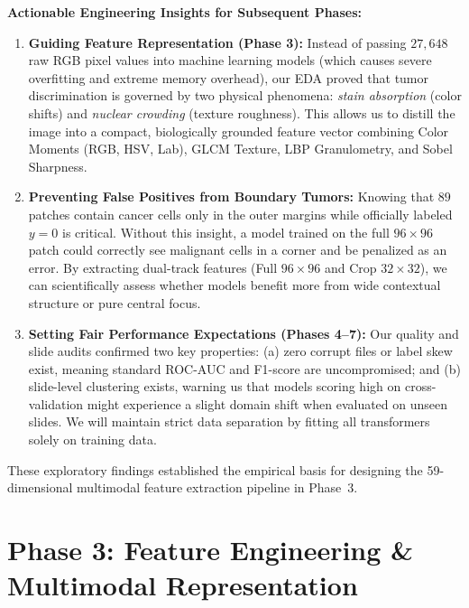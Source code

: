 \documentclass[11pt,a4paper]{article}
\begin{document}
\noindent\textbf{Actionable Engineering Insights for Subsequent Phases:}
\begin{enumerate}
    \item \textbf{Guiding Feature Representation (Phase 3):}
    Instead of passing $27,648$ raw RGB pixel values into machine learning models (which causes severe overfitting and extreme memory overhead), our EDA proved that tumor discrimination is governed by two physical phenomena: \textit{stain absorption} (color shifts) and \textit{nuclear crowding} (texture roughness). This allows us to distill the image into a compact, biologically grounded feature vector combining Color Moments (RGB, HSV, Lab), GLCM Texture, LBP Granulometry, and Sobel Sharpness.
    
    \item \textbf{Preventing False Positives from Boundary Tumors:}
    Knowing that $89$ patches contain cancer cells only in the outer margins while officially labeled $y = 0$ is critical. Without this insight, a model trained on the full $96 \times 96$ patch could correctly see malignant cells in a corner and be penalized as an error. By extracting dual-track features (Full $96 \times 96$ and Crop $32 \times 32$), we can scientifically assess whether models benefit more from wide contextual structure or pure central focus.
    
    \item \textbf{Setting Fair Performance Expectations (Phases 4--7):}
    Our quality and slide audits confirmed two key properties: (a) zero corrupt files or label skew exist, meaning standard ROC-AUC and F1-score are uncompromised; and (b) slide-level clustering exists, warning us that models scoring high on cross-validation might experience a slight domain shift when evaluated on unseen slides. We will maintain strict data separation by fitting all transformers solely on training data.
\end{enumerate}

These exploratory findings established the empirical basis for designing the 59-dimensional multimodal feature extraction pipeline in Phase~3.

\section{Phase 3: Feature Engineering \& Multimodal Representation}
\end{document}
